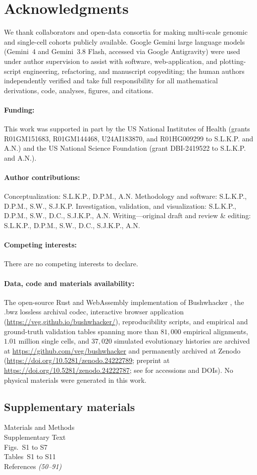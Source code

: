 \documentclass[12pt]{article}
\begin{document}
\clearpage




\section*{Acknowledgments}
We thank collaborators and open-data consortia for making multi-scale genomic and single-cell cohorts publicly available. Google Gemini large language models (Gemini~4 and Gemini~3.8 Flash, accessed via Google Antigravity) were used under author supervision to assist with software, web-application, and plotting-script engineering, refactoring, and manuscript copyediting; the human authors independently verified and take full responsibility for all mathematical derivations, code, analyses, figures, and citations.
\paragraph*{Funding:}
This work was supported in part by the US National Institutes of Health (grants R01GM151683, R01GM144468, U24AI183870, and R01HG009299 to S.L.K.P. and A.N.) and the US National Science Foundation (grant DBI-2419522 to S.L.K.P. and A.N.).
\paragraph*{Author contributions:}
Conceptualization: S.L.K.P., D.P.M., A.N. Methodology and software: S.L.K.P., D.P.M., S.W., S.J.K.P. Investigation, validation, and visualization: S.L.K.P., D.P.M., S.W., D.C., S.J.K.P., A.N. Writing---original draft and review \& editing: S.L.K.P., D.P.M., S.W., D.C., S.J.K.P., A.N.
\paragraph*{Competing interests:}
There are no competing interests to declare.
\paragraph*{Data, code and materials availability:}
The open-source Rust and WebAssembly implementation of Bushwhacker \cite{bushwhacker_code}, the .bwz lossless archival codec, interactive browser application (\url{https://veg.github.io/bushwhacker/}), reproducibility scripts, and empirical and ground-truth validation tables spanning more than $81,000$ empirical alignments, $1.01$ million single cells, and $37,020$ simulated evolutionary histories are archived at \url{https://github.com/veg/bushwhacker} and permanently archived at Zenodo (\url{https://doi.org/10.5281/zenodo.24222789}; preprint at \url{https://doi.org/10.5281/zenodo.24222787}; see \cite{methods} for accessions and DOIs). No physical materials were generated in this work.

\subsection*{Supplementary materials}
Materials and Methods\\
Supplementary Text\\
Figs.~S1 to S7\\
Tables~S1 to S11\\
References \textit{(50--91)}
\end{document}
